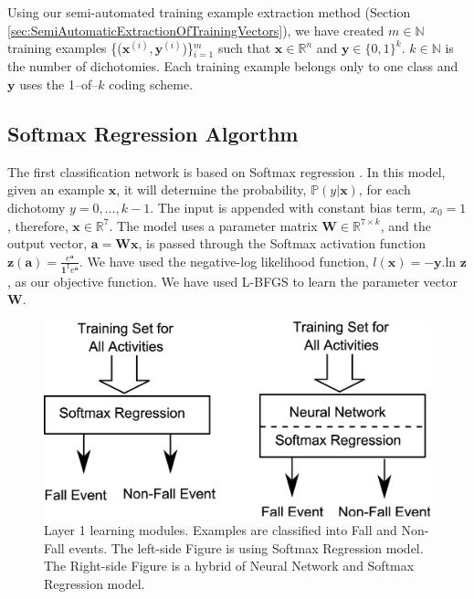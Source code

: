 \documentclass{IEEEtran}
\begin{document}
Using our semi-automated training example extraction method (Section 
\ref{sec:SemiAutomaticExtractionOfTrainingVectors}), we have created $m \in 
\mathbb{N}$ 
training examples 
\{($\mathbf{x}^{(i)}, \mathbf{y}^{(i)}$)\}$_{i=1}^m$ such that $\mathbf{x} \in 
\mathbb{R}^{n}$ 
and 
$\mathbf{y} \in 
\{0,1\}^k$. $k \in 
\mathbb{N}$ is the number of dichotomies. Each training example belongs only to one class 
and $\mathbf{y}$ uses the 1--of--$k$ coding scheme.    

\subsection{Softmax Regression Algorthm}
\label{sec:SoftmaxRegrationAlgorthm}

The first classification network is based on Softmax regression \cite{Bishop06a}. In this 
model, given an 
example $\mathbf{x}$, it will determine the probability, $\mathbb{P}(y | \mathbf{x})$, 
for 
each dichotomy $y=0,\ldots,k-1$. The input is appended with constant bias 
term, $x_0 = 1$, therefore, $\mathbf{x} \in \mathbb{R}^7$. The model uses a parameter 
matrix 
$\mathbf{W} 
\in \mathbb{R}^{7 \times k}$, and the output vector, $\mathbf{a} = \mathbf{Wx}$, is 
passed 
through 
the 
Softmax 
activation function $\mathbf{z(a)} = \frac{e^{\mathbf{a}}}{\mathbf{1}^\mathtt{T}
e^{\mathbf{a}}}$. We have 
used the negative-log likelihood function, $l(\mathbf{x}) = -\mathbf{y}$.ln $\mathbf{z}$, 
as our 
objective function. We have used L-BFGS \cite{DBLP:conf/icml/LeNCLPN11} to learn the 
parameter vector $\mathbf{W}$.  

\begin{figure}[htbp]
	\centering
		\includegraphics[width=0.98\columnwidth]{figures/SoftmaxLayer1.eps}
	\caption{Layer 1 learning modules. Examples are classified into Fall and Non-Fall events.  The left-side Figure is using Softmax Regression model. The Right-side Figure is a hybrid of Neural Network and Softmax Regression model.}
	\label{fig:SoftmaxLayer1}
\end{figure}
\end{document}
